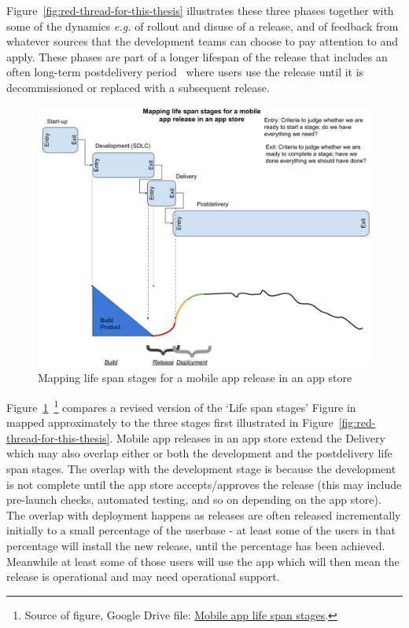 Figure~\ref{fig:red-thread-for-this-thesis} illustrates these three phases together with some of the dynamics \emph{e.g.} of rollout and disuse of a release, and of feedback from whatever sources that the development teams can choose to pay attention to and apply. These phases are part of a longer lifespan of the release that includes an often long-term postdelivery period~\citep[pp 156-157]{evans2004_achieving_software_quality_through_teamwork} where users use the release until it is decommissioned or replaced with a subsequent release.

\begin{figure}
    \centering
    \includegraphics[width=16cm]{images/my/Mobile-app-life-span-stages.png}
    \caption{Mapping life span stages for a mobile app release in an app store}
    \label{fig:mobile-app-life-span-stages}
\end{figure}

Figure~\ref{fig:mobile-app-life-span-stages}~\footnote{Source of figure, Google Drive file: \href{https://docs.google.com/document/d/1d4B5l1tlpclHdKwY8W00qchiCV2YK5JjJP8TbkRHcjQ/edit}{Mobile app life span stages}.} compares a revised version of the `Life span stages' Figure in~\citep[p.155]{evans2004_achieving_software_quality_through_teamwork} mapped approximately to the three stages first illustrated in Figure~\ref{fig:red-thread-for-this-thesis}. Mobile app releases in an app store extend the Delivery which may also overlap either or both the development and the postdelivery life span stages. The overlap with the development stage is because the development is not complete until the app store accepts/approves the release (this may include pre-launch checks, automated testing, and so on depending on the app store). The overlap with deployment happens as releases are often released incrementally initially to a small percentage of the userbase - at least some of the users in that percentage will install the new release, until the percentage has been achieved. Meanwhile at least some of those users will use the app which will then mean the release is operational and may need operational support.


